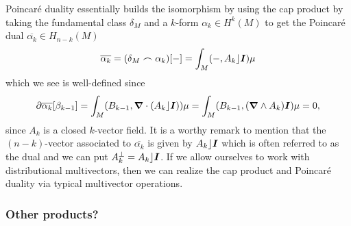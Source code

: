 \documentclass{article}
\begin{document}
Poincar\'e duality essentially builds the isomorphism by using the cap product by taking the fundamental class $\delta_M$ and a $k$-form $\alpha_k \in H^k(M)$ to get the Poincar\'e dual $\overline{\alpha_k} \in H_{n-k}(M)$
\begin{equation}
\overline{\alpha_k} = (\delta_M \frown \alpha_k)[-] = \int_M (-,A_k \rfloor \boldsymbol{I})\mu
\end{equation}
which we see is well-defined since
\begin{align}
\partial \overline{\alpha_k}[\beta_{k-1}] = \int_M (B_{k-1}, \boldsymbol{\nabla} \cdot (A_k \rfloor \boldsymbol{I}))\mu = \int_M (B_{k-1},(\boldsymbol{\nabla} \wedge A_k)\boldsymbol{I}) \mu =0,
\end{align}
since $A_k$ is a closed $k$-vector field. It is a worthy remark to mention that the $(n-k)$-vector associated to $\overline{\alpha_k}$ is given by $A_k \rfloor \boldsymbol{I}$ which is often referred to as the dual and we can put $A_k^\perp = A_k \rfloor \boldsymbol{I}$. If we allow ourselves to work with distributional multivectors, then we can realize the cap product and Poincar\'e duality via typical multivector operations.

\subsubsection{Other products?}
\end{document}
